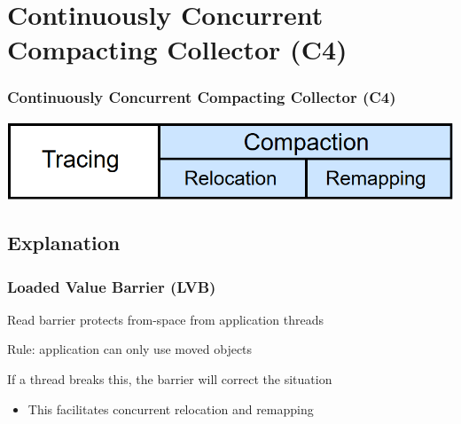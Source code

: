 \documentclass{beamer}
\newcommand{\linespace}{\vskip 0.25cm}
\begin{document}
\section[C4]{Continuously Concurrent Compacting Collector (C4)}

\begin{frame}

\frametitle{Continuously Concurrent Compacting Collector (C4)}

\begin{center}
\includegraphics[width=.85\textwidth]{Illustrations/gc_cycle_locator_compaction.png}
\end{center}

\end{frame}



\subsection*{Explanation}

\begin{frame}

\frametitle{Loaded Value Barrier (LVB)}

Read barrier protects from-space from application threads

\linespace
\linespace

Rule: application can only use moved objects

\linespace
\linespace

If a thread breaks this, the barrier will correct the situation
\begin{itemize}
\item This facilitates concurrent relocation and remapping
\end{itemize}

\end{frame}
\end{document}
